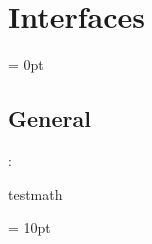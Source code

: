 
\section{Interfaces} 


\parskip = 0pt

\vspace{3mm} \subsection*{General}

: 

testmath
\vspace{2mm}

\vspace{5mm}\parskip = 10pt 
